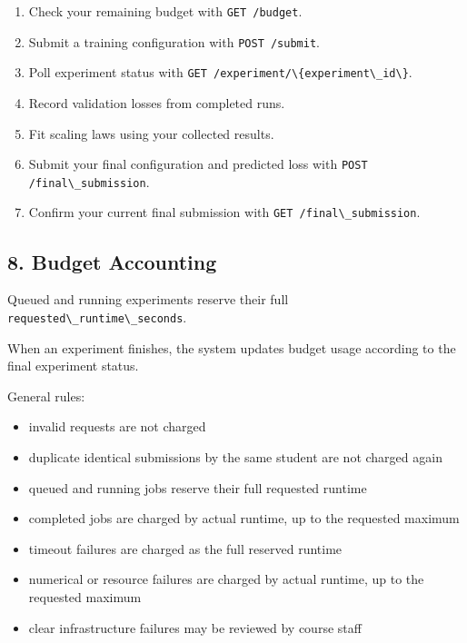 \documentclass[
  11pt,
]{article}
\newcommand{\passthrough}[1]{#1}
\providecommand{\tightlist}{%
  \setlength{\itemsep}{0pt}\setlength{\parskip}{0pt}}
\begin{document}
\begin{enumerate}
\def\labelenumi{\arabic{enumi}.}
\tightlist
\item
  Check your remaining budget with
  \passthrough{\lstinline!GET /budget!}.
\item
  Submit a training configuration with
  \passthrough{\lstinline!POST /submit!}.
\item
  Poll experiment status with
  \passthrough{\lstinline!GET /experiment/\{experiment\_id\}!}.
\item
  Record validation losses from completed runs.
\item
  Fit scaling laws using your collected results.
\item
  Submit your final configuration and predicted loss with
  \passthrough{\lstinline!POST /final\_submission!}.
\item
  Confirm your current final submission with
  \passthrough{\lstinline!GET /final\_submission!}.
\end{enumerate}

\hypertarget{budget-accounting}{%
\subsection{8. Budget Accounting}\label{budget-accounting}}

Queued and running experiments reserve their full
\passthrough{\lstinline!requested\_runtime\_seconds!}.

When an experiment finishes, the system updates budget usage according
to the final experiment status.

General rules:

\begin{itemize}
\tightlist
\item
  invalid requests are not charged
\item
  duplicate identical submissions by the same student are not charged
  again
\item
  queued and running jobs reserve their full requested runtime
\item
  completed jobs are charged by actual runtime, up to the requested
  maximum
\item
  timeout failures are charged as the full reserved runtime
\item
  numerical or resource failures are charged by actual runtime, up to
  the requested maximum
\item
  clear infrastructure failures may be reviewed by course staff
\end{itemize}
\end{document}
